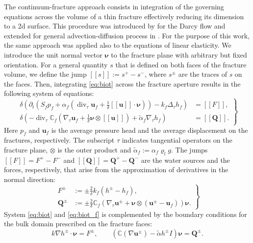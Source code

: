 \documentclass{article}
\newcommand{\CC}{\mathbb C}
\renewcommand{\div}{\operatorname{div}}
\newcommand{\eq}[1]{\begin{equation}#1\end{equation}}
\newcommand{\jmp}[1]{[\![#1]\!]}
\newcommand{\uu}{\vc u}
\newcommand{\vc}[1]{\boldsymbol{#1}}
\begin{document}
The continuum-fracture approach consists in integration of the governing equations across the volume of a thin fracture effectively reducing its dimension to a 2d surface. This procedure was introduced by \cite{martin_modeling_2005} for the Darcy flow and extended for general advection-diffusion process in \cite{brezina_analysis_2015}. For the purpose of this work, the same approach was applied also to the equations of linear elasticity. We introduce the unit normal vector $\vc\nu$ to the fracture plane with arbitrary but fixed orientation.
For a general quantity $s$ that is defined on both faces of the fracture volume, we define the jump $\jmp{s}:=s^+-s^-$, where $s^\pm$ are the traces of $s$ on the faces. 
Then, integrating \eqref{eq:biot} across the fracture aperture results in the following system of equations:
\eq{\label{eq:biot_f}\left.\begin{aligned}
\delta\left(\partial_t\left(S_fp_f + \alpha_f\left(\div_\tau\uu_f+\tfrac1\delta\jmp{\uu}\cdot\vc\nu\right)\right) - k_f\Delta_\tau h_f\right) &= \jmp{F}, \\
\delta\left(-\div_\tau\CC_f(\nabla_\tau\uu_f+\tfrac1\delta\vc\nu\otimes\jmp{\uu}) + \tilde\alpha_f\nabla_\tau h_f\right) &= \jmp{\vc Q}.
\end{aligned}\right\} }
Here $p_f$ and $\uu_f$ is the average pressure head and the average displacement on the fractures, respectively. The subscript $\tau$ indicates tangential operators on the fracture plane, $\otimes$ is the outer product and $\tilde\alpha_f:=\alpha_f\varrho_l g$.
The jumps $\jmp{F}=F^+-F^-$ and $\jmp{\vc Q}=\vc Q^+-\vc Q^-$ are the water sources and the forces, respectively, that arise from the approximation of derivatives in the normal direction:
\eq{ 
\label{eq:fr_coupling}
\left.\begin{aligned}
F^\pm &:= \pm\frac2\delta k_f(h^\pm-h_f),\\
\vc Q^\pm &:= \pm\frac2\delta\CC_f(\nabla_\tau\uu^\pm + \vc\nu\otimes(\uu^\pm-\uu_f))\vc\nu. %
\end{aligned}\right\} 
}
System \eqref{eq:biot} and \eqref{eq:biot_f} is complemented by the boundary conditions for the bulk domain prescribed on the fracture faces:
\eq{ 
\label{eq:fr_coupling_bulk}
k\nabla h^\pm\cdot\vc\nu = F^\pm,\qquad \left(\CC(\nabla\uu^\pm) - \tilde\alpha h^\pm I\right)\vc\nu = \vc Q^\pm. 
}
\end{document}
